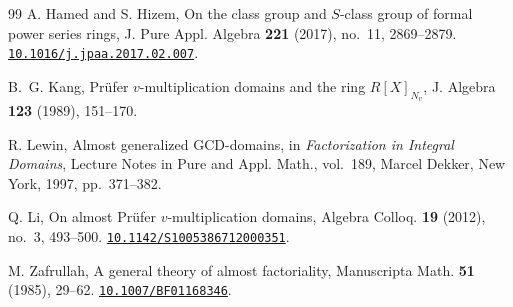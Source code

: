 \documentclass[11pt]{amsart}
\theoremstyle{definition}
\theoremstyle{remark}
\newcommand{\doi}[1]{\href{https://doi.org/#1}{\nolinkurl{#1}}}
\begin{document}
\begin{thebibliography}{99}
A. Hamed and S. Hizem,
On the class group and $S$-class group of formal power series rings,
J. Pure Appl. Algebra \textbf{221} (2017), no.~11, 2869--2879.
\doi{10.1016/j.jpaa.2017.02.007}.

B.~G. Kang,
Pr\"ufer $v$-multiplication domains and the ring $R[X]_{N_v}$,
J. Algebra \textbf{123} (1989), 151--170.

R. Lewin,
Almost generalized GCD-domains,
in \emph{Factorization in Integral Domains},
Lecture Notes in Pure and Appl. Math., vol.~189,
Marcel Dekker, New York, 1997, pp.~371--382.

Q. Li,
On almost Pr\"ufer $v$-multiplication domains,
Algebra Colloq. \textbf{19} (2012), no.~3, 493--500.
\doi{10.1142/S1005386712000351}.

M. Zafrullah,
A general theory of almost factoriality,
Manuscripta Math. \textbf{51} (1985), 29--62.
\doi{10.1007/BF01168346}.

\end{thebibliography}
\end{document}
